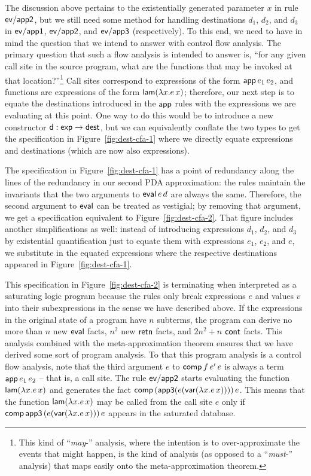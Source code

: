 The discussion above pertains to the existentially generated parameter
$x$ in rule ${\sf ev/app2}$, but we still need some method for
handling destinations $d_1$, $d_2$, and $d_3$ in ${\sf ev/app1}$,
${\sf ev/app2}$, and ${\sf ev/app3}$ (respectively). To this end, we
need to have in mind the question that we intend to answer with
control flow analysis. The primary question that such a flow analysis
is intended to answer is, ``for any given call site in the source
program, what are the functions that may be invoked at that
location?''\footnote{This kind of ``{\it may}-'' analysis, where the
  intention is to over-approximate the events that might happen, is
  the kind of analysis (as opposed to a ``{\it must}-'' analysis) that
  maps easily onto the meta-approximation theorem.} Call sites
correspond to expressions of the form ${\sf app}\,e_1\,e_2$, and
functions are expressions of the form ${\sf lam}(\lambda x.e\,x)$;
therefore, our next step is to equate the destinations introduced in
the ${\sf app}$ rules with the expressions we are evaluating at this
point. One way to do this would be to introduce a new constructor
${\sf d}: {\sf exp} \rightarrow {\sf dest}$, but we can equivalently
conflate the two types to get the specification in
Figure~\ref{fig:dest-cfa-1} where we directly equate expressions and
destinations (which are now also expressions). 

The specification in Figure~\ref{fig:dest-cfa-1} has a point of
redundancy along the lines of the redundancy in our second PDA
approximation: the rules maintain the invariants that the two
arguments to ${\sf eval}\,e\,d$ are always the same. Therefore, the
second argument to ${\sf eval}$ can be treated as vestigial; by
removing that argument, we get a specification equivalent to
Figure~\ref{fig:dest-cfa-2}. That figure includes another
simplifications as well: instead of introducing expressions $d_1$,
$d_2$, and $d_3$ by existential quantification just to equate them
with expressions $e_1$, $e_2$, and $e$, we substitute in the equated
expressions where the respective destinations appeared in
Figure~\ref{fig:dest-cfa-1}. 

This specification in Figure~\ref{fig:dest-cfa-2} is terminating when
interpreted as a saturating logic program because the rules only break
expressions $e$ and values $v$ into their subexpressions in the sense
we have described above. If the expressions in the original state of a
program have $n$ subterms, the program can derive no more than $n$ new
${\sf eval}$ facts, $n^2$ new ${\sf retn}$ facts, and $2n^2 + n$ ${\sf
  cont}$ facts. This analysis combined with the meta-approximation
theorem ensures that we have derived some sort of program analysis. To
that this program analysis is a control flow analysis, note that the
third argument $e$ to ${\sf comp}\,f\,e'\,e$ is always a term ${\sf
  app}\,e_1\,e_2$ -- that is, a call site. The rule ${\sf ev/app2}$
starts evaluating the function ${\sf lam}(\lambda x.e\,x)$ and
generates the fact ${\sf comp}\,({\sf app3}(e({\sf var}(\lambda
x.e\,x))))\,e$. This means that the function ${\sf lam}(\lambda
x.e\,x)$ may be called from the call site $e$ only if ${\sf
  comp}\,{\sf app3}\,(e({\sf var}(\lambda x.e\,x)))\,e$ appears in the
saturated database.

